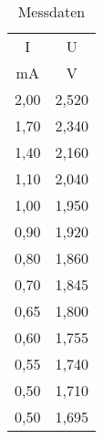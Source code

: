 

\begin{table}
  \centering
  \caption{Messdaten}
  \label{tab:some_data}
  \begin{tabular}{c c }
    \toprule
     I  &	 U	   \\
     mA &  V     \\
    \midrule
  2,00 & 2,520\\
  1,70 & 2,340\\
  1,40 & 2,160\\
  1,10 & 2,040\\
  1,00 & 1,950\\
  0,90 & 1,920\\
  0,80 & 1,860\\
  0,70 & 1,845\\
  0,65 & 1,800\\
  0,60 & 1,755\\
  0,55 & 1,740\\
  0,50 & 1,710\\
  0,50 & 1,695\\

    \bottomrule
  \end{tabular}
\end{table}
